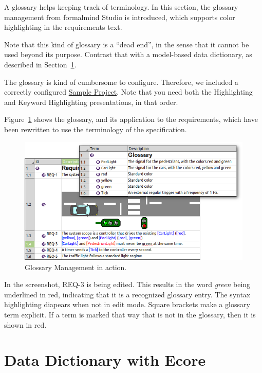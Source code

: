 A glossary helps keeping track of terminology.  In this section, the glossary management from formalmind Studio is introduced, which supports color highlighting in the requirements text.

Note that this kind of glossary is a ``dead end'', in the sense that it cannot be used beyond its purpose.  Contrast that with a model-based data dictionary, as described in Section~\ref{sec:tutorial-ecore}.

The glossary is kind of cumbersome to configure.   Therefore, we included a correctly configured \href{../se-materials/tutorial/tdse-2/}{Sample Project}.  Note that you need both the Highlighting and Keyword Highlighting presentations, in that order.

Figure~\ref{fig:tutorial-step02} shows the glossary, and its application to the requirements, which have been rewritten to use the terminology of the specification.

\begin{figure}[h!]
  \centering
  \includegraphics[width=\linewidth]{../se-images/tutorial-step02.png}
  \caption{Glossary Management in action.}
  \label{fig:tutorial-step02}
\end{figure}

In the screenshot, REQ-3 is being edited.  This results in the word \textit{green} being underlined in red, indicating that it is a recognized glossary entry.  The syntax highlighting diapears when not in edit mode.  Square brackets make a glossary term explicit.  If a term is marked that way that is not in the glossary, then it is shown in red.

\section{Data Dictionary with Ecore}
\label{sec:tutorial-ecore}

